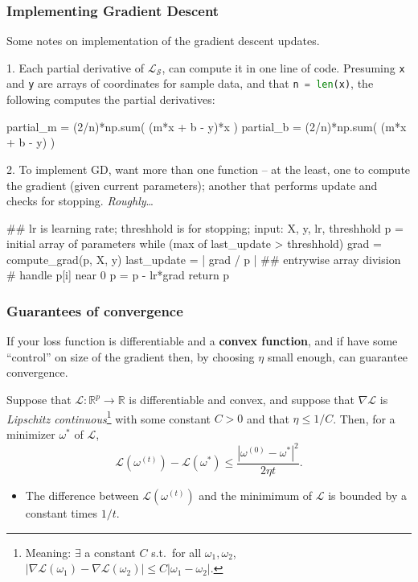 \documentclass{beamer}
\newenvironment{codeblock}
    {\hfill\begin{beamerboxesrounded}[lower=codecol, width=0.8\textwidth]
    \medskip

    }
    { 
    \end{beamerboxesrounded}\hfill
    }
\theoremstyle{example}
\begin{document}
\begin{frame}[fragile]
    \frametitle{Implementing Gradient Descent}
    Some notes on implementation of the gradient descent updates.
    
    {\color{mygreen}1.} Each partial derivative of $\mathcal L_{\mathcal S}$, can compute it in one line of code. \pause Presuming \texttt{x} and \texttt{y} are arrays of coordinates for sample data, and that \lstinline[language=Python,basicstyle=\ttfamily,keywordstyle=\color{keywords}]{n = len(x)}, the following computes the partial derivatives:

\begin{codeblock}

\begin{python}
partial_m = (2/n)*np.sum( (m*x + b - y)*x )
partial_b = (2/n)*np.sum( (m*x + b - y) )
\end{python}

\end{codeblock}

    \pause
    {\color{mygreen}2.} To implement GD, want more than one function {--} at the least, one to compute the gradient (given current parameters); another that performs update and checks for stopping. \textit{Roughly}\ldots
\pause

\begin{pseudo}
## lr is learning rate; threshhold is for stopping;
input: X, y, lr, threshhold
p = initial array of parameters
while (max of last_update > threshhold){
    grad = compute_grad(p, X, y)
    last_update = | grad / p | ## entrywise array division
    # handle p[i] near 0
    p = p - lr*grad
}
return p
\end{pseudo}
\end{frame}

\begin{frame}
    \frametitle{Guarantees of convergence}
    If your loss function is differentiable and a \textbf{convex function}, and if have some ``control'' on size of the gradient then, by choosing $\eta$ small enough, can guarantee convergence. 

    \pause
    \begin{theorem}Suppose that $\mathcal L:\mathbb R^p\to\mathbb R$ is differentiable and convex, and suppose that $\nabla \mathcal L$ is \textit{Lipschitz continuous}\footnote{Meaning: $\exists$ a constant $C$ s.t.\ for all $\omega_1, \omega_2$, $|\nabla\mathcal L(\omega_1) - \nabla\mathcal L(\omega_2)| \le C|\omega_1 - \omega_2|$.} with some constant $C>0$ and that $\eta \le 1/C$. Then, for a minimizer $\omega^*$ of $\mathcal L$, 
            \[\mathcal L(\omega^{(t)}) - \mathcal L(\omega^*) \le \frac{|\omega^{(0)} - \omega^*|^2}{2\eta t}.\]
    \end{theorem}
    \pause
    \begin{itemize}
        \item The difference between $\mathcal L(\omega^{(t)})$ and the minimimum of $\mathcal L$ is bounded by a constant times $1/t$.
    \end{itemize}
\end{frame}
\end{document}
